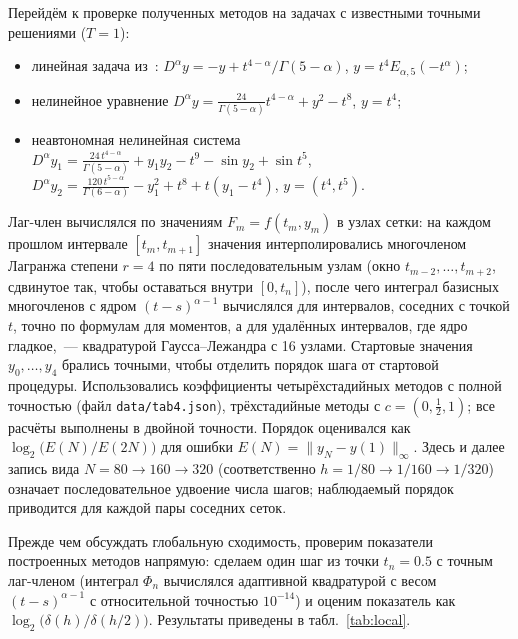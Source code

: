 \documentclass[11pt,a4paper]{article}
\theoremstyle{plain}
\theoremstyle{definition}
\newcommand{\G}{\Gamma}
\begin{document}
Перейдём к проверке полученных методов на задачах с известными точными решениями ($T=1$):
\begin{itemize}
\item[(L)] линейная задача из~\cite{Ghaffari2023}: $D^{\alpha}y=-y+t^{4-\alpha}/\G(5-\alpha)$, $y=t^4E_{\alpha,5}(-t^{\alpha})$;
\item[(N)] нелинейное уравнение $D^{\alpha}y=\frac{24}{\G(5-\alpha)}t^{4-\alpha}+y^2-t^8$, $y=t^4$;
\item[(S)] неавтономная нелинейная система $D^{\alpha}y_1=\frac{24\,t^{4-\alpha}}{\G(5-\alpha)}+y_1y_2-t^9-\sin y_2+\sin t^5$, $D^{\alpha}y_2=\frac{120\,t^{5-\alpha}}{\G(6-\alpha)}-y_1^2+t^8+t(y_1-t^4)$, $y=(t^4,t^5)$.
\end{itemize}
Лаг-член вычислялся по значениям $F_m=f(t_m,y_m)$ в узлах сетки: на каждом прошлом интервале $[t_m,t_{m+1}]$ значения интерполировались многочленом Лагранжа степени $r=4$ по пяти последовательным узлам (окно $t_{m-2},\dots,t_{m+2}$, сдвинутое так, чтобы оставаться внутри $[0,t_n]$), после чего интеграл базисных многочленов с ядром $(t-s)^{\alpha-1}$ вычислялся для интервалов, соседних с точкой $t$, точно по формулам для моментов, а для удалённых интервалов, где ядро гладкое,~--- квадратурой Гаусса--Лежандра с 16 узлами. Стартовые значения $y_0,\dots,y_4$ брались точными, чтобы отделить порядок шага от стартовой процедуры. Использовались коэффициенты четырёхстадийных методов с полной точностью (файл \texttt{data/tab4.json}), трёхстадийные методы с $c=(0,\frac12,1)$; все расчёты выполнены в двойной точности. Порядок оценивался как $\log_2\bigl(E(N)/E(2N)\bigr)$ для ошибки $E(N)=\|y_N-y(1)\|_\infty$. Здесь и далее запись вида $N=80\to160\to320$ (соответственно $h=1/80\to1/160\to1/320$) означает последовательное удвоение числа шагов; наблюдаемый порядок приводится для каждой пары соседних сеток.

Прежде чем обсуждать глобальную сходимость, проверим показатели построенных методов напрямую: сделаем один шаг из точки $t_n=0.5$ с точным лаг-членом (интеграл $\Phi_n$ вычислялся адаптивной квадратурой с весом $(t-s)^{\alpha-1}$ с относительной точностью $10^{-14}$) и оценим показатель как $\log_2\bigl(\delta(h)/\delta(h/2)\bigr)$. Результаты приведены в табл.~\ref{tab:local}.
\end{document}
